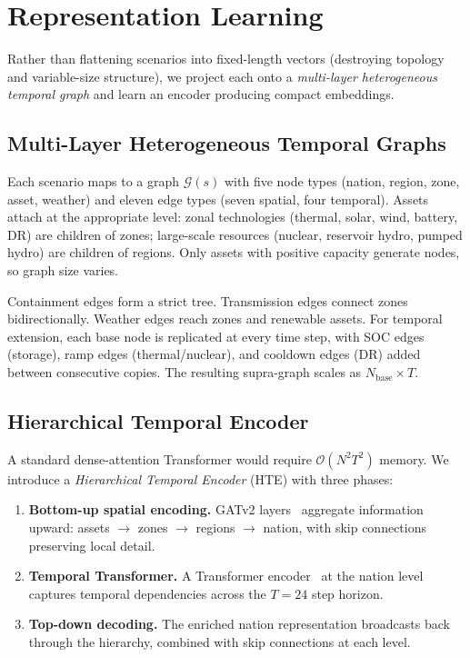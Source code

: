 \documentclass{article}
\begin{document}
\section{Representation Learning}
\label{sec:graph_encoder}

Rather than flattening scenarios into fixed-length vectors (destroying topology and variable-size structure), we project each onto a \emph{multi-layer heterogeneous temporal graph} and learn an encoder producing compact embeddings.

\subsection{Multi-Layer Heterogeneous Temporal Graphs}
\label{sec:graph_projection}

Each scenario maps to a graph $\mathcal{G}(s)$ with five node types (nation, region, zone, asset, weather) and eleven edge types (seven spatial, four temporal). Assets attach at the appropriate level: zonal technologies (thermal, solar, wind, battery, DR) are children of zones; large-scale resources (nuclear, reservoir hydro, pumped hydro) are children of regions. Only assets with positive capacity generate nodes, so graph size varies.

Containment edges form a strict tree. Transmission edges connect zones bidirectionally. Weather edges reach zones and renewable assets. For temporal extension, each base node is replicated at every time step, with SOC edges (storage), ramp edges (thermal/nuclear), and cooldown edges (DR) added between consecutive copies. The resulting supra-graph scales as $N_{\mathrm{base}} \times T$.

\subsection{Hierarchical Temporal Encoder}
\label{sec:hte}

A standard dense-attention Transformer would require $\mathcal{O}(N^2 T^2)$ memory. We introduce a \emph{Hierarchical Temporal Encoder} (HTE) with three phases:

\begin{enumerate}[noitemsep]
  \item \textbf{Bottom-up spatial encoding.} GATv2 layers~\citep{brody_how_2022} aggregate information upward: assets $\to$ zones $\to$ regions $\to$ nation, with skip connections preserving local detail.
  \item \textbf{Temporal Transformer.} A Transformer encoder~\citep{vaswani2017attention} at the nation level captures temporal dependencies across the $T{=}24$ step horizon.
  \item \textbf{Top-down decoding.} The enriched nation representation broadcasts back through the hierarchy, combined with skip connections at each level.
\end{enumerate}
\end{document}

